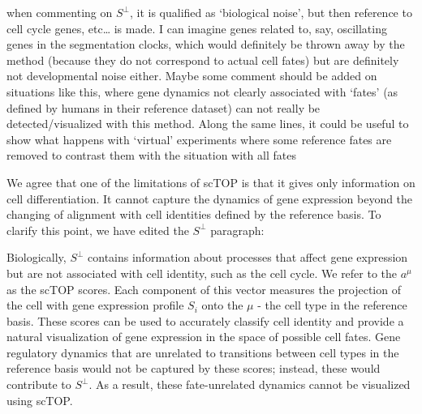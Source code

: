 \documentclass[12pt,american]{scrartcl}
\begin{document}
\begin{revcomment}
    when commenting on $S^\perp$, it is qualified as ‘biological noise’, but
 then reference to cell cycle genes, etc… is made. I can imagine genes 
related to, say, oscillating genes in the segmentation clocks, which 
would definitely be thrown away by the method (because they do not 
correspond to actual cell fates) but are definitely not developmental 
noise either. Maybe some comment should be added on situations like 
this, where gene dynamics not clearly associated with ‘fates’ (as 
defined by humans in their reference dataset) can not really be 
detected/visualized with this method. Along the same lines, it could be 
useful to show what happens with ‘virtual’ experiments where some 
reference fates are removed to contrast them with the situation with all fates
\end{revcomment}
\begin{revresponse}
    We agree that one of the limitations of scTOP is that it gives only information on cell differentiation. It cannot capture the dynamics of gene expression beyond the changing of alignment with cell identities defined by the reference basis. To clarify this point, we have edited the $S^{\perp}$ paragraph:

    \begin{changes}
        Biologically, $S^{\perp}$ contains information about processes that affect gene expression but are not associated with cell identity, such as the cell cycle. We refer to the $a^{\mu}$ as the scTOP scores. Each component of this vector measures the projection of the cell with gene expression profile $S_i$ onto the $\mu$ - the cell type in the reference basis. These scores can be used to accurately classify cell identity and provide a natural visualization of gene expression in the space of possible cell fates. Gene regulatory dynamics that are unrelated to transitions between cell types in the reference basis would not be captured by these scores; instead, these would contribute to $S^{\perp}$. As a result, these fate-unrelated dynamics cannot be visualized using scTOP.
    \end{changes}
\end{revresponse}
\end{document}
